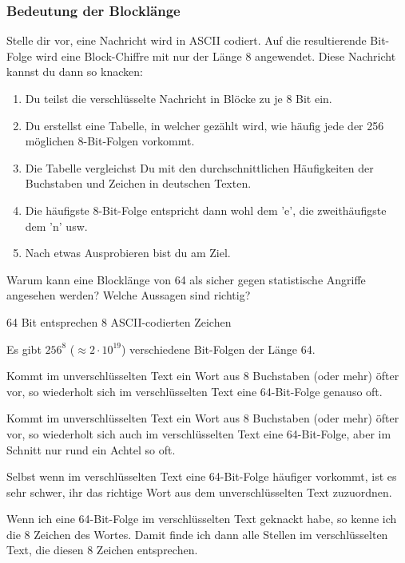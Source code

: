 \documentclass[%
11pt,%
twoside,%
titlepage,%
german,%
headsepline%
]{scrartcl}
\begin{document}
\subsubsection{Bedeutung der Blocklänge}

Stelle dir vor, eine Nachricht wird in ASCII codiert. Auf die resultierende Bit-Folge wird eine Block-Chiffre mit nur der Länge 8 angewendet. 
Diese Nachricht kannst du dann so knacken:
\begin{enumerate}
\item Du teilst die verschlüsselte Nachricht in Blöcke zu je 8 Bit ein.
\item Du erstellst eine Tabelle, in welcher gezählt wird, wie häufig jede der 256 möglichen 8-Bit-Folgen vorkommt.
\item Die Tabelle vergleichst Du mit den durchschnittlichen Häufigkeiten der Buchstaben und Zeichen in deutschen Texten.
\item Die häufigste 8-Bit-Folge entspricht dann wohl dem 'e', die zweithäufigste dem 'n' usw.
\item Nach etwas Ausprobieren bist du am Ziel.
\end{enumerate}

\begin{ueb}
Warum kann eine Blocklänge von 64 als sicher gegen statistische Angriffe angesehen werden? Welche Aussagen sind richtig?
\begin{enumeratea}
\item 64 Bit entsprechen 8 ASCII-codierten Zeichen
\item Es gibt $256^8$ ($\approx 2 \cdot 10^{19}$) verschiedene Bit-Folgen der Länge 64.
\item Kommt im unverschlüsselten Text ein Wort aus 8 Buchstaben 
    (oder mehr) öfter vor, so wiederholt sich im 
    verschlüsselten Text eine 64-Bit-Folge genauso oft.
\item Kommt im unverschlüsselten Text ein Wort aus 8 Buchstaben 
    (oder mehr) öfter vor, so wiederholt sich auch im 
    verschlüsselten Text eine 64-Bit-Folge, aber im 
    Schnitt nur rund ein Achtel so oft.
\item Selbst wenn im verschlüsselten Text eine 64-Bit-Folge 
    häufiger vorkommt, ist es sehr schwer, ihr das richtige 
    Wort aus dem unverschlüsselten Text zuzuordnen.
\item Wenn ich eine 64-Bit-Folge im verschlüsselten Text geknackt 
    habe, so kenne ich die 8 Zeichen des Wortes. Damit finde 
    ich dann alle Stellen im verschlüsselten Text, die diesen 
    8 Zeichen entsprechen.
\end{enumeratea}
\end{ueb}
\end{document}
